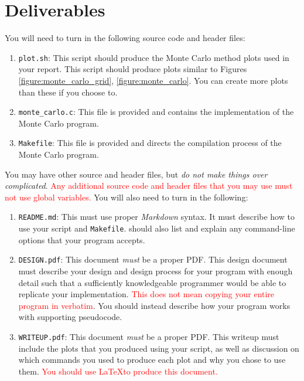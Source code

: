 \section{Deliverables}

You will need to turn in the following source code and header files:

\begin{enumerate}
  \item \texttt{plot.sh}: This \Bash{} script should produce the Monte Carlo
    method plots used in your report. This script should produce plots similar to Figures  \ref{figure:monte_carlo_grid}, \ref{figure:monte_carlo}. You can create more plots than these if you
    choose to.
  \item \texttt{monte\_carlo.c}: This file is provided and contains the
    implementation of the Monte Carlo program.
  \item \texttt{Makefile}: This file is provided and directs the compilation
    process of the Monte Carlo program.
\end{enumerate}

You may have other source and header files, but \emph{do not make things
over complicated}. \textcolor{red}{Any additional source code and header
files that you may use must not use global variables.}
You will also need to turn in the following:

\begin{enumerate}
        \item \texttt{README.md}: This must use proper \emph{Markdown} syntax. It
    must describe how to use your script and \texttt{Makefile}.
    should also list and explain any command-line options that your
    program accepts.
  \item \texttt{DESIGN.pdf}: This document \emph{must} be a proper PDF\@. This
    design document must describe your design and design process for your
    program with enough detail such that a sufficiently knowledgeable programmer
    would be able to replicate your implementation. \textcolor{red}{This does
    not mean copying your entire program in verbatim}. You should instead
    describe how your program works with supporting pseudocode.
  \item \texttt{WRITEUP.pdf}: This document \emph{must} be a proper
    PDF\@. This writeup must include the plots that you produced using your
    \Bash{} script, as well as discussion on which \Unix{} commands you
    used to produce each plot and why you chose to use them.
                \textcolor{red}{You should use \LaTeX to produce this document.}
\end{enumerate}

